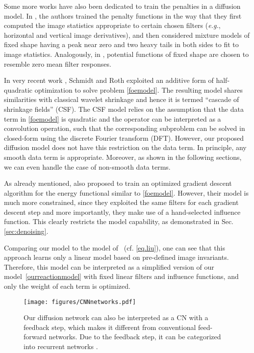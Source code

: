 \documentclass[10pt,journal,compsoc]{IEEEtran}
\newcommand{\eg}{\emph{e.g.}}
\begin{document}
{Some more works have also been dedicated to train the penalties in a diffusion 
model. In \cite{KrajsekS10}, the authors trained the penalty functions in the way that 
they first computed the image statistics appropriate to certain 
chosen filters (\eg, horizontal and vertical image derivatives), and then 
considered mixture models of fixed shape having a peak near zero and two heavy tails 
in both sides to fit to image statistics. 
Analogously, in \cite{ScharrBH03}, potential functions of fixed shape are chosen to 
resemble zero mean filter responses. 

In very recent work \cite{CSF2014}, Schmidt and Roth exploited an additive form of half-quadratic optimization to solve problem \eqref{foemodel}. The resulting model shares similarities with classical wavelet shrinkage and hence it is termed ``cascade of shrinkage fields'' (CSF). 
The CSF model relies on the assumption that the data term in \eqref{foemodel} is quadratic and the operator  can 
be interpreted as a convolution operation, such that the corresponding subproblem can be solved in closed-form using the discrete Fourier transform (DFT). However, our proposed diffusion model does not have this restriction on the data term. In principle, any smooth data term is appropriate. Moreover, as shown in the following sections, we can even handle the case of non-smooth data terms. 

As already mentioned, \cite{Barbu2009, DomkeAISTATS2012} also proposed to train an optimized gradient descent algorithm for the energy functional 
similar to \eqref{foemodel}. However, their model is much more constrained, since they exploited the same 
filters for each gradient descent step and more importantly, they make use of a hand-selected influence function. This clearly restricts the model capability, as demonstrated in Sec. \ref{sec:denoising}. 

Comparing our model to the model of~\cite{liu2010learning}
(cf. \eqref{eq.liu}), one can see that this approach learns only a
linear model based on pre-defined image invariants. Therefore, this
model can be interpreted as a simplified version of our
model~\eqref{ourreactionmodel} with fixed linear filters and influence
functions, and only the weight of each term is optimized.}


\begin{figure}[t!]
\centering
\vspace{-0.5cm}
\hspace*{-0.8cm} {\texttt{[image: figures/CNNnetworks.pdf]}}
\vspace*{-1cm}
\caption{Our diffusion network can also be interpreted as a CN with a 
feedback step, which makes it different from conventional feed-forward networks. Due to the feedback step, 
it can be categorized into recurrent networks \cite{graves2009offline}. 
}\label{fig:recurrentCNN}
\vspace{-0.4cm}
\end{figure}
\end{document}
